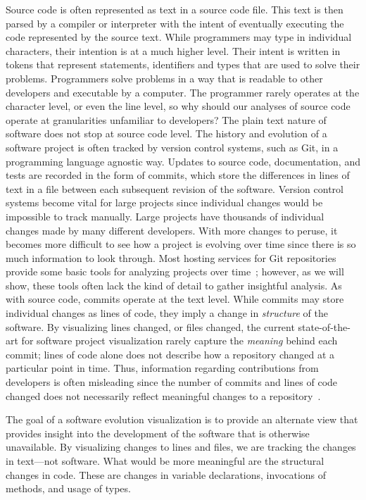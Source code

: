 Source code is often represented as text in a source code file. This text is then parsed by a compiler or interpreter with the intent of eventually executing the code represented by the source text. While programmers may type in individual characters, their intention is at a much higher level. Their intent is written in tokens that represent statements, identifiers and types that are used to solve their problems. Programmers solve problems in a way that is readable to other developers and executable by a computer. The programmer rarely operates at the character level, or even the line level, so why should our analyses of source code operate at granularities unfamiliar to developers?
The plain text nature of software does not stop at source code level. The history and evolution of a software project is often tracked by version control systems, such as Git, in a programming language agnostic way. Updates to source code, documentation, and tests are recorded in the form of commits, which store the differences in lines of text in a file between each subsequent revision of the software. Version control systems become vital for large projects since individual changes would be impossible to track manually. Large projects have thousands of individual changes made by many different developers. With more changes to peruse, it becomes more difficult to see how a project is evolving over time since there is so much information to look through. Most hosting services for Git repositories provide some basic tools for analyzing projects over time~\cite{github-graphs,bitbucket-graphs}; however, as we will show, these tools often lack the kind of detail to gather insightful analysis. As with source code, commits operate at the text level. While commits may store individual changes as lines of code, they imply a change in \emph{structure} of the software.  By visualizing lines changed, or files changed, the current state-of-the-art for software project visualization rarely capture the \emph{meaning} behind each commit; lines of code alone does not describe how a repository changed at a particular point in time. Thus, information regarding contributions from developers is often misleading since the number of commits and lines of code changed does not necessarily reflect meaningful changes to a repository~\cite{robles2014}.

The goal of a software evolution visualization is to provide an alternate view that provides insight into the development of the software that is otherwise unavailable. By visualizing changes to lines and files, we are tracking the changes in text---not software. What would be more meaningful are the structural changes in code. These are changes in variable declarations, invocations of methods, and usage of types.

